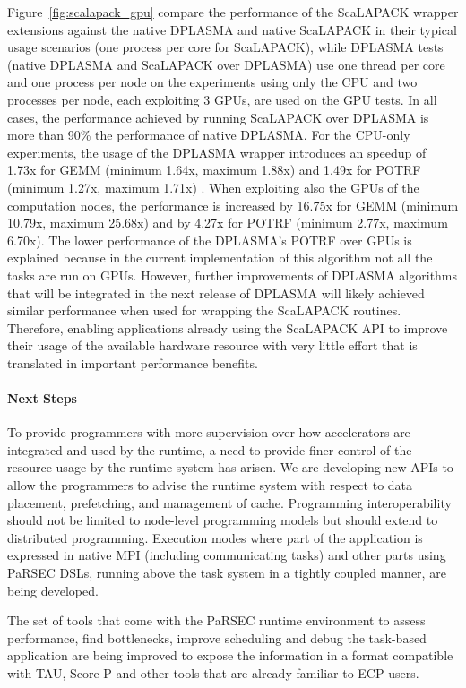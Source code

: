 Figure~\ref{fig:scalapack_gpu} compare the
performance of the ScaLAPACK wrapper extensions against the native
DPLASMA and native ScaLAPACK in their typical usage scenarios (one
process per core for ScaLAPACK),
while DPLASMA tests (native DPLASMA and ScaLAPACK over DPLASMA) use
one thread per core and one process per node on the experiments using
only the CPU and two processes per node, each exploiting 3 GPUs, are
used on the GPU tests.
%
In all cases, the performance achieved by running ScaLAPACK over
DPLASMA is more than 90\% the performance of native DPLASMA.  For the
CPU-only experiments, the usage of the DPLASMA wrapper introduces an
speedup of 1.73x for GEMM (minimum 1.64x, maximum 1.88x) and 1.49x for
POTRF (minimum 1.27x, maximum 1.71x) .  When exploiting also the GPUs
of the computation nodes, the performance is increased by 16.75x for
GEMM (minimum 10.79x, maximum 25.68x) and by 4.27x for POTRF (minimum
2.77x, maximum 6.70x).  The lower performance of the DPLASMA's POTRF
over GPUs is explained because in the current implementation of this
algorithm not all the tasks are run on GPUs. However, further
improvements of DPLASMA algorithms that will be integrated in the next
release of DPLASMA will likely achieved similar performance when used
for wrapping the ScaLAPACK routines. Therefore, enabling applications
already using the ScaLAPACK API to improve their usage of the
available hardware resource with very little effort that is translated
in important performance benefits.

%
%

\paragraph{Next Steps}
To provide programmers with more supervision over how accelerators are
integrated and used by the runtime, a need to provide finer control of the
resource usage by the runtime system has arisen. We are developing new APIs to
allow the programmers to advise the runtime system with respect to data
placement, prefetching, and management of cache.
%
Programming interoperability should not be limited to node-level programming
models but should extend to distributed programming. Execution modes where part
of the application is expressed in native MPI (including communicating tasks)
and other parts using PaRSEC DSLs, running above the task system in a tightly
coupled manner, are being developed.


The set of tools that come with the PaRSEC runtime environment to
assess performance, find bottlenecks, improve scheduling and debug the
task-based application are being improved to expose the information
in a format compatible with TAU, Score-P and other
tools that are already familiar to ECP users.
